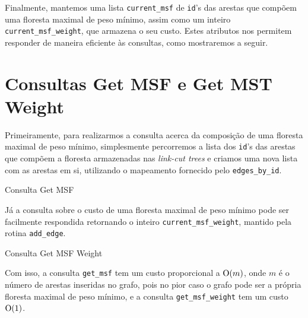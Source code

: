 Finalmente, mantemos uma lista \texttt{current\_msf} de \texttt{id}'s das arestas que compõem uma floresta maximal de peso mínimo, assim como um inteiro \texttt{current\_msf\_weight}, que armazena o seu custo. Estes atributos nos permitem responder de maneira eficiente às consultas, como mostraremos a seguir.

\section{Consultas Get MSF e Get MST Weight}
\label{sec:imsf-get-msf}

Primeiramente, para realizarmos a consulta acerca da composição de uma floresta maximal de peso mínimo, simplesmente percorremos a lista dos \texttt{id}'s das arestas que compõem a floresta armazenadas nas \emph{link-cut trees} e criamos uma nova lista com as arestas em si, utilizando o mapeamento fornecido pelo \texttt{edges\_by\_id}.

\begin{algorithm}[h!]
    \caption{Consulta Get MSF}\label{imsf-get-msf}
    \begin{algorithmic}[1]
        \EndFor
        \State {}
        \EndFunction
    \end{algorithmic}
\end{algorithm}

Já a consulta sobre o custo de uma floresta maximal de peso mínimo pode ser facilmente respondida retornando o inteiro \texttt{current\_msf\_weight}, mantido pela rotina \texttt{add\_edge}.

\begin{algorithm}[h!]
    \caption{Consulta Get MSF Weight}\label{imsf-get-msf-weight}
    \begin{algorithmic}[1]
        \State {}
        \EndFunction
    \end{algorithmic}
\end{algorithm}

Com isso, a consulta \texttt{get\_msf} tem um custo proporcional a $\mathrm{O}(m)$, onde $m$ é o número de arestas inseridas no grafo, pois no pior caso o grafo pode ser a própria floresta maximal de peso mínimo, e a consulta \texttt{get\_msf\_weight} tem um custo $\mathrm{O}(1)$.

